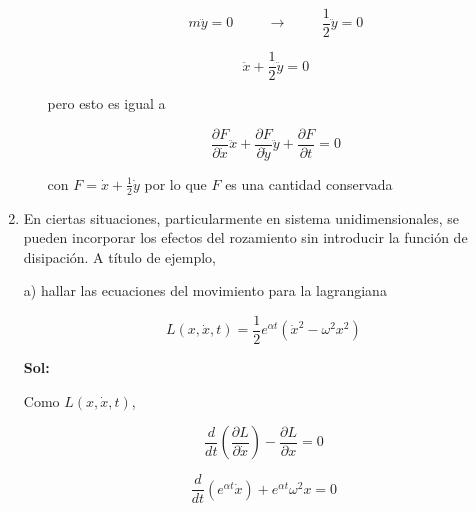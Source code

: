\documentclass[12pt,a4paper]{article}
\begin{document}
\begin{enumerate}
\begin{enumerate}
            \begin{equation*}
                m\ddot{y} = 0 \hspace{1cm} \rightarrow \hspace{1cm} \frac{1}{2} \ddot{y} = 0
            \end{equation*}
            
            \begin{equation*}
                \ddot{x} + \frac{1}{2} \ddot{y} = 0
            \end{equation*}
            
            pero esto es igual a 
            
            \begin{equation*}
                \frac{\partial F}{\partial \dot{x}} \ddot{x} + \frac{\partial F}{\partial \dot{y}} \ddot{y} + \frac{\partial F}{\partial t} = 0
            \end{equation*}
            
            con $F= \dot{x} + \frac{1}{2} \dot{y}$ por lo que $F$ es una cantidad conservada
            
            
            
        \end{enumerate}
        
        
        
        
        
        \item En ciertas situaciones, particularmente en sistema unidimensionales, se pueden incorporar los efectos del rozamiento sin introducir la función de disipación. A título de ejemplo,
        
        a) hallar las ecuaciones del movimiento para la lagrangiana
        
        \begin{equation*}
            L(x,\dot{x}, t) = \frac{1}{2} e^{\alpha t} (\dot{x}^2 - \omega^2 x^2)
        \end{equation*}
        
        \textbf{Sol:}
        
        Como $L(x,\dot{x},t)$,
        
        \begin{equation*}
            \frac{d}{dt}\left(\frac{\partial L}{\partial \dot{x}}\right) - \frac{\partial L}{\partial x} = 0
        \end{equation*}
        
        \begin{equation*}
            \frac{d}{dt}\left(e^{\alpha t} \dot{x}\right) + e^{\alpha t} \omega^2 x = 0
        \end{equation*}
        

\end{enumerate}
\end{document}
